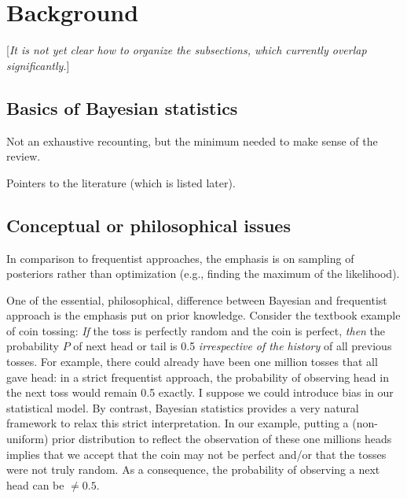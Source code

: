 \section{Background}  \label{sec:background}

[\emph{It is not yet clear how to organize the subsections, which currently overlap
  significantly.}]



\subsection{Basics of Bayesian statistics}  \label{subsec:basic_Bayes}

\bi
  \I Not an exhaustive recounting, but the minimum needed to make sense of
    the review.

  \I Pointers to the literature (which is listed later).
\ei


\subsection{Conceptual or philosophical issues} \label{subsec:conceptual_issues}

\bi
  \I In comparison to frequentist approaches, the emphasis is on sampling of posteriors
    rather than optimization (e.g., finding the maximum of the likelihood).

  \I 
One of the essential, philosophical, difference between Bayesian and frequentist approach is the emphasis put on prior knowledge. Consider the textbook example of coin tossing: 
{\it If} the toss is perfectly random and the coin is perfect, {\it then} the probability $P$ of next head or tail is 0.5 {\it irrespective of the history} of all previous tosses. For example, there could already have been one million tosses that all gave head: in a strict frequentist approach, the probability of observing head in the next toss would remain 0.5 exactly. {\color{blue} I suppose we could introduce bias in our statistical model}. By contrast, Bayesian statistics provides a very natural framework to relax this strict interpretation. In our example, putting a (non-uniform) prior distribution to reflect the observation of these one millions heads implies that we accept that the coin may not be perfect and/or that the tosses were not truly random. As a consequence, the probability of observing a next head can be $\neq 0.5$.

